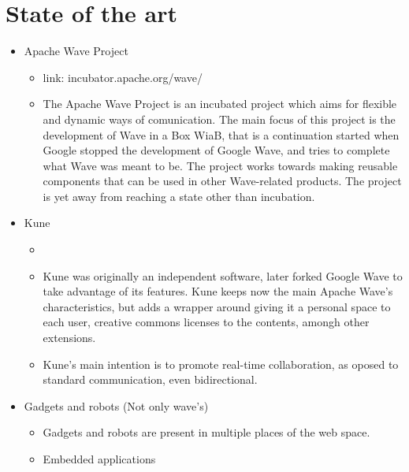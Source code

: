 
\newpage
\section{State of the art}


\begin{itemize}
  \item Apache Wave Project
  \begin{itemize}
    \item link: incubator.apache.org/wave/
    \item The Apache Wave Project is an incubated project which aims for flexible and dynamic ways of comunication. The main focus of this project is the development of Wave in a Box WiaB, that is a continuation started when Google stopped the development of Google Wave, and tries to complete what Wave was meant to be. The project works towards making reusable components that can be used in other Wave-related products. The project is yet away from reaching a state other than incubation.
  \end{itemize}
  \item Kune
  \begin{itemize}
    \item {}
    \item Kune was originally an independent software, later forked Google Wave to take advantage of its features. Kune keeps now the main Apache Wave's characteristics, but adds a wrapper around giving it a personal space to each user, creative commons licenses to the contents, amongh other extensions.
    \item Kune's main intention is to promote real-time collaboration, as oposed to standard communication, even bidirectional.
  \end{itemize}
  \item Gadgets and robots (Not only wave's)
    \begin{itemize}
      \item Gadgets and robots are present in multiple places of the web space.
      \item Embedded applications
      \begin{itemize}

\end{itemize}
\end{itemize}
\end{itemize}
